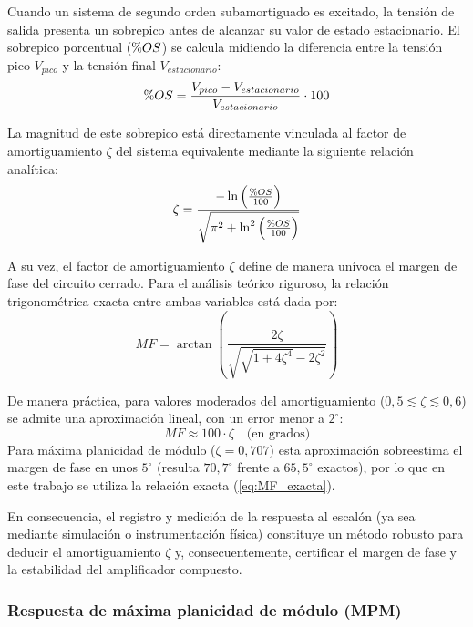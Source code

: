 Cuando un sistema de segundo orden subamortiguado es excitado, la tensión de salida presenta un sobrepico antes de alcanzar su valor de estado estacionario. El sobrepico porcentual ($\mathrm{\char37}OS$) se calcula midiendo la diferencia entre la tensión pico $V_{pico}$ y la tensión final $V_{estacionario}$:
\begin{equation}
    \mathrm{\char37}OS = \frac{V_{pico} - V_{estacionario}}{V_{estacionario}} \cdot 100
    \label{eq:OS}
\end{equation}

La magnitud de este sobrepico está directamente vinculada al factor de amortiguamiento $\zeta$ del sistema equivalente mediante la siguiente relación analítica:
\begin{equation}
    \zeta = \frac{-\ln\left(\frac{\mathrm{\char37}OS}{100}\right)}{\sqrt{\pi^2 + \ln^2\left(\frac{\mathrm{\char37}OS}{100}\right)}}
    \label{eq:zeta}
\end{equation}

A su vez, el factor de amortiguamiento $\zeta$ define de manera unívoca el margen de fase del circuito cerrado. Para el análisis teórico riguroso, la relación trigonométrica exacta entre ambas variables está dada por:
\begin{equation}
    MF = \arctan\left( \frac{2\zeta}{\sqrt{\sqrt{1+4\zeta^4}-2\zeta^2}} \right)
    \label{eq:MF_exacta}
\end{equation}

De manera práctica, para valores moderados del amortiguamiento ($0{,}5 \lesssim \zeta \lesssim 0{,}6$) se admite una aproximación lineal, con un error menor a $2^\circ$:
\begin{equation}
    MF \approx 100 \cdot \zeta \quad \text{(en grados)}
    \label{eq:MF_aprox}
\end{equation}
Para máxima planicidad de módulo ($\zeta = 0{,}707$) esta aproximación sobreestima el margen de fase en unos $5^\circ$ (resulta $70{,}7^\circ$ frente a $65{,}5^\circ$ exactos), por lo que en este trabajo se utiliza la relación exacta (\autoref{eq:MF_exacta}).

En consecuencia, el registro y medición de la respuesta al escalón (ya sea mediante simulación o instrumentación física) constituye un método robusto para deducir el amortiguamiento $\zeta$ y, consecuentemente, certificar el margen de fase y la estabilidad del amplificador compuesto.

\subsubsection{Respuesta de máxima planicidad de módulo (MPM)}
\label{sec:mpm}

